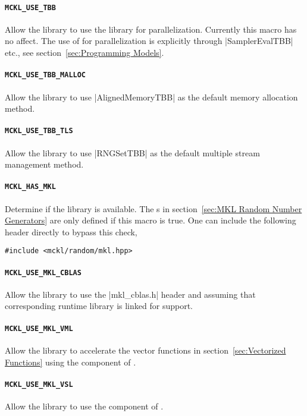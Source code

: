 \paragraph{\texttt{MCKL\_USE\_TBB}} Allow the library to use the \tbb library
for parallelization. Currently this macro has no affect. The use of \tbb for
parallelization is explicitly through |SamplerEvalTBB| etc., see
section~\ref{sec:Programming Models}.

\paragraph{\texttt{MCKL\_USE\_TBB\_MALLOC}} Allow the library to use
|AlignedMemoryTBB| as the default memory allocation method.

\paragraph{\texttt{MCKL\_USE\_TBB\_TLS}} Allow the library to use |RNGSetTBB|
as the default multiple \rng stream management method.

\paragraph{\texttt{MCKL\_HAS\_MKL}} Determine if the \mkl library is available.
The \rng{}s in section~\ref{sec:MKL Random Number Generators} are only defined
if this macro is true. One can include the following header directly to bypass
this check,
\begin{verbatim}
#include <mckl/random/mkl.hpp>
\end{verbatim}

\paragraph{\texttt{MCKL\_USE\_MKL\_CBLAS}} Allow the library to use the
|mkl_cblas.h| header and assuming that corresponding runtime library is linked
for \blas support.

\paragraph{\texttt{MCKL\_USE\_MKL\_VML}} Allow the library to accelerate the
vector functions in section~\ref{sec:Vectorized Functions} using the \vml
component of \mkl.

\paragraph{\texttt{MCKL\_USE\_MKL\_VSL}} Allow the library to use the \vsl
component of \mkl.

